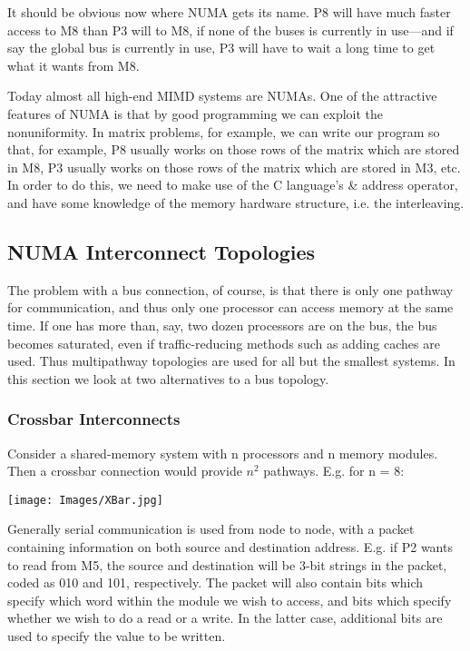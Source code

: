 It should be obvious now where NUMA gets its name. P8 will have much
faster access to M8 than P3 will to M8, if none of the buses is
currently in use---and if say the global bus is currently in use, P3
will have to wait a long time to get what it wants from M8.

Today almost all high-end MIMD systems are NUMAs.  One of the attractive
features of NUMA is that by good programming we can exploit the
nonuniformity.  In matrix problems, for example, we can write our
program so that, for example, P8 usually works on those rows of the
matrix which are stored in M8, P3 usually works on those rows of the
matrix which are stored in M3, etc. In order to do this, we need to make
use of the C language's \& address operator, and have some knowledge of
the memory hardware structure, i.e. the interleaving.

\subsection{NUMA Interconnect Topologies}

The problem with a bus connection, of course, is that there is only one
pathway for communication, and thus only one processor can access memory
at the same time.  If one has more than, say, two dozen processors are
on the bus, the bus becomes saturated, even if traffic-reducing methods
such as adding caches are used. Thus multipathway topologies are used
for all but the smallest systems.  In this section we look at two
alternatives to a bus topology.

\subsubsection{Crossbar Interconnects}

Consider a shared-memory system with n processors and n memory modules.
Then a crossbar connection would provide \( n^{2} \) pathways. E.g. for n =
8:

\texttt{[image: Images/XBar.jpg]}

Generally serial communication is used from node to node, with a packet
containing information on both source and destination address. E.g. if
P2 wants to read from M5, the source and destination will be 3-bit
strings in the packet, coded as 010 and 101, respectively.  The packet
will also contain bits which specify which word within the module we
wish to access, and bits which specify whether we wish to do a read or a
write.  In the latter case, additional bits are used to specify the
value to be written.

